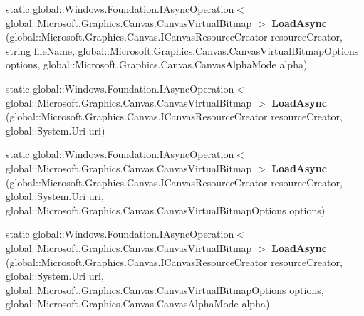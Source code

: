 \begin{DoxyCompactItemize}
static global\+::\+Windows.\+Foundation.\+I\+Async\+Operation$<$ global\+::\+Microsoft.\+Graphics.\+Canvas.\+Canvas\+Virtual\+Bitmap $>$ {\bfseries Load\+Async} (global\+::\+Microsoft.\+Graphics.\+Canvas.\+I\+Canvas\+Resource\+Creator resource\+Creator, string file\+Name, global\+::\+Microsoft.\+Graphics.\+Canvas.\+Canvas\+Virtual\+Bitmap\+Options options, global\+::\+Microsoft.\+Graphics.\+Canvas.\+Canvas\+Alpha\+Mode alpha)
\item 
\mbox{\label{class_microsoft_1_1_graphics_1_1_canvas_1_1_canvas_virtual_bitmap_ad38275a64145b2d51079b6c5e251fab4}} 
static global\+::\+Windows.\+Foundation.\+I\+Async\+Operation$<$ global\+::\+Microsoft.\+Graphics.\+Canvas.\+Canvas\+Virtual\+Bitmap $>$ {\bfseries Load\+Async} (global\+::\+Microsoft.\+Graphics.\+Canvas.\+I\+Canvas\+Resource\+Creator resource\+Creator, global\+::\+System.\+Uri uri)
\item 
\mbox{\label{class_microsoft_1_1_graphics_1_1_canvas_1_1_canvas_virtual_bitmap_acd074c002643745470070fedca4bc142}} 
static global\+::\+Windows.\+Foundation.\+I\+Async\+Operation$<$ global\+::\+Microsoft.\+Graphics.\+Canvas.\+Canvas\+Virtual\+Bitmap $>$ {\bfseries Load\+Async} (global\+::\+Microsoft.\+Graphics.\+Canvas.\+I\+Canvas\+Resource\+Creator resource\+Creator, global\+::\+System.\+Uri uri, global\+::\+Microsoft.\+Graphics.\+Canvas.\+Canvas\+Virtual\+Bitmap\+Options options)
\item 
\mbox{\label{class_microsoft_1_1_graphics_1_1_canvas_1_1_canvas_virtual_bitmap_accb66d38d50f8d67a23664ce8819c262}} 
static global\+::\+Windows.\+Foundation.\+I\+Async\+Operation$<$ global\+::\+Microsoft.\+Graphics.\+Canvas.\+Canvas\+Virtual\+Bitmap $>$ {\bfseries Load\+Async} (global\+::\+Microsoft.\+Graphics.\+Canvas.\+I\+Canvas\+Resource\+Creator resource\+Creator, global\+::\+System.\+Uri uri, global\+::\+Microsoft.\+Graphics.\+Canvas.\+Canvas\+Virtual\+Bitmap\+Options options, global\+::\+Microsoft.\+Graphics.\+Canvas.\+Canvas\+Alpha\+Mode alpha)
\item 
\mbox{\label{class_microsoft_1_1_graphics_1_1_canvas_1_1_canvas_virtual_bitmap_a56e5e79a80dccfdc011f98e647de9bcf}} 

\end{DoxyCompactItemize}
